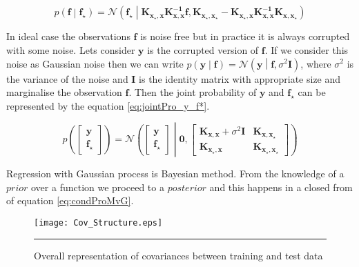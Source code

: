\begin{equation} \label{eq:condProMvG}
p \left( \mathbf{f} \middle| \mathbf{f_\star} \right) =
\mathcal{N}\left( \mathbf{f_\star} \middle| \mathbf{K_{x_\star,x}}  \mathbf{K^{-1}_{x,x}} \mathbf{f,} \mathbf{K_{x_\star,x_\star}} - 
\mathbf{K_{x_\star,x}} \mathbf{K^{-1}_{x,x}} \mathbf{K_{x,x_\star}}\right)
\end{equation}

In ideal case the observations $\mathbf{f}$ is noise free but in practice it is always corrupted with some noise. Lets consider $\mathbf{y}$ is the corrupted version of $\mathbf{f}$. If we consider this noise as Gaussian noise then we can write $p \left( \mathbf{y} \middle| \mathbf{f} \right) = \mathcal{N} \left( \mathbf{y} \middle| \mathbf{f}, \sigma^2 \mathbf{I} \right) $, where $ \sigma^2 $ is the variance of the noise and $\mathbf{I}$ is the identity matrix with appropriate size and marginalise the observation $\mathbf{f}$. Then the joint probability of $\mathbf{y}$ and $\mathbf{f_\star}$ can be represented by the equation \ref{eq:jointPro_y_f*}.

\begin{equation} \label{eq:jointPro_y_f*}
p \left( \begin{bmatrix} \mathbf{y} \\\mathbf{f_\star} \end{bmatrix} \right) =
\mathcal{N}\left( \begin{bmatrix} \mathbf{y} \\\mathbf{f_\star} \end{bmatrix} \middle|
\mathbf{0}, \begin{bmatrix} \mathbf{K_{x,x}}+ \sigma^2\mathbf{I} & \mathbf{K_{x,x_\star}} \\
			    \mathbf{K_{x_\star,x}} & \mathbf{K_{x_\star,x_\star}} \end{bmatrix} \right)
\end{equation}

Regression with Gaussian process is Bayesian method. From the knowledge of a $prior$ over a function we proceed to a $posterior$ and this happens in a closed from of equation \ref{eq:condProMvG}. 

\begin{figure}[t]
	\centering
		\texttt{[image: Cov\_Structure.eps]}
		\rule{35em}{0.5pt}
	\caption[Overall representation of covariances between training and test data]
		{Overall representation of covariances between training and test data}
	\label{fig:Covariances_Structure}
\end{figure}


